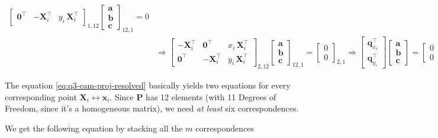 \begin{align}
\begin{bmatrix}
        \mathbf{0}^\top & - \mathbf{X}^\top_i & y_i \, \mathbf{X}^\top_i
        \end{bmatrix}_{1, 12} \begin{bmatrix}
        \mathbf{a} \\ \mathbf{b} \\ \mathbf{c}
        \end{bmatrix}_{12, 1} = 0
    \nonumber \\
    &\Rightarrow \begin{bmatrix}
        - \mathbf{X}_i^\top & \mathbf{0}^\top & x_i \, \mathbf{X}^\top_i \\
        \mathbf{0}^\top & - \mathbf{X}^\top_i & y_i \, \mathbf{X}^\top_i
        \end{bmatrix}_{2, 12} \begin{bmatrix}
        \mathbf{a} \\ \mathbf{b} \\ \mathbf{c}
        \end{bmatrix}_{12, 1} = \begin{bmatrix}
        0 \\ 0
        \end{bmatrix}_{2, 1} \Rightarrow \begin{bmatrix}
        \mathbf{q}_{x_i}^\top \\
        \mathbf{q}_{y_i}^\top
        \end{bmatrix} \begin{bmatrix}
        \mathbf{a} \\ \mathbf{b} \\ \mathbf{c}
        \end{bmatrix} = \begin{bmatrix}
        0 \\ 0
        \end{bmatrix}
    \label{eq:q3-cam-proj-resolved}
\end{align}

The equation \ref{eq:q3-cam-proj-resolved} basically yields two equations for every corresponding point $\mathbf{X}_i \leftrightarrow \mathbf{x}_i$. Since $\mathbf{P}$ has 12 elements (with 11 Degrees of Freedom, since it's a homogeneous matrix), we need \textit{at least} six correspondences. 

We get the following equation by stacking all the $m$ correspondences

